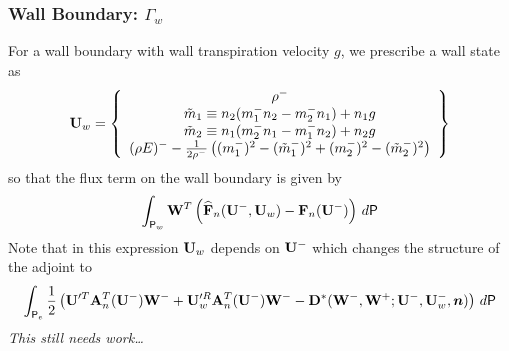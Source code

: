 \documentclass[12pt]{article}
\begin{document}
\subsubsection{Wall Boundary: $\Gamma_w$}
For a wall boundary with wall transpiration velocity $g$, we prescribe a wall
state as
\begin{equation}
{{\bf U}}_w = \left\{ \begin{array}{c} 
\rho^- \\
\tilde m_1 \equiv n_2 ( m^-_1 n_2 - m^-_2 n_1 ) + n_1 g \\
\tilde m_2 \equiv n_1 ( m^-_2 n_1 - m^-_1 n_2 ) + n_2 g \\
(\rho E)^- - \frac{1}{2\rho^-}\left( (m^-_1)^2 - (\tilde m^-_1)^2 + 
                                (m^-_2)^2 - (\tilde m^-_2)^2 \right)
\end{array} \right\}
\end{equation}
so that the flux term on the wall boundary is given by
\begin{equation}
\int_{{\sf P}_w} {\bf W}^T \left( {\widehat{{\bf F}}}_n({{\bf U}}^-,{{\bf U}}_w) - {\bf F}_n({{\bf U}}^-) \right) \,d{\sf P}
\end{equation}
Note that in this expression ${{\bf U}}_w$ depends on ${{\bf U}}^-$ which
changes the structure of the adjoint to
\begin{equation}
\int_{{\sf P}_e}  \frac{1}{2}\left( {{\bf U}}'^T {\bf A}^T_n({{\bf U}}^-) {\bf W}^- +
                                {{\bf U}}'^R_w {\bf A}^T_n({{\bf U}}^-) {\bf W}^- -
                               {\bf D}^*({\bf W}^-,{\bf W}^+;{{\bf U}}^-,{{\bf U}}^-_w,{\boldsymbol n}) \right) 
                               \,d{\sf P}
\end{equation}
{\em This still needs work\dots}
\end{document}
